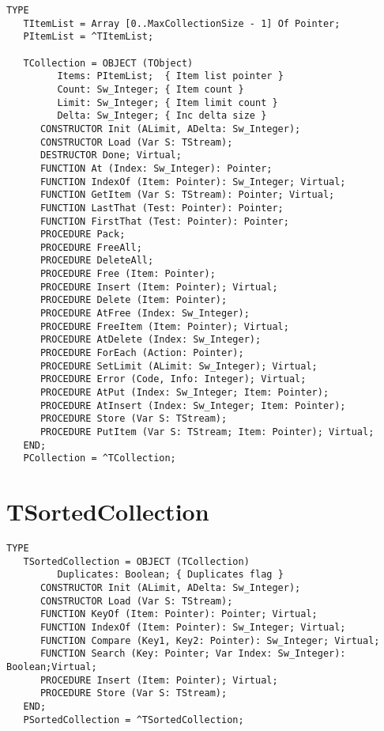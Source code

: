 \begin{verbatim}
TYPE
   TItemList = Array [0..MaxCollectionSize - 1] Of Pointer;
   PItemList = ^TItemList;

   TCollection = OBJECT (TObject)
         Items: PItemList;  { Item list pointer }
         Count: Sw_Integer; { Item count }
         Limit: Sw_Integer; { Item limit count }
         Delta: Sw_Integer; { Inc delta size }
      CONSTRUCTOR Init (ALimit, ADelta: Sw_Integer);
      CONSTRUCTOR Load (Var S: TStream);
      DESTRUCTOR Done; Virtual;
      FUNCTION At (Index: Sw_Integer): Pointer;
      FUNCTION IndexOf (Item: Pointer): Sw_Integer; Virtual;
      FUNCTION GetItem (Var S: TStream): Pointer; Virtual;
      FUNCTION LastThat (Test: Pointer): Pointer;
      FUNCTION FirstThat (Test: Pointer): Pointer;
      PROCEDURE Pack;
      PROCEDURE FreeAll;
      PROCEDURE DeleteAll;
      PROCEDURE Free (Item: Pointer);
      PROCEDURE Insert (Item: Pointer); Virtual;
      PROCEDURE Delete (Item: Pointer);
      PROCEDURE AtFree (Index: Sw_Integer);
      PROCEDURE FreeItem (Item: Pointer); Virtual;
      PROCEDURE AtDelete (Index: Sw_Integer);
      PROCEDURE ForEach (Action: Pointer);
      PROCEDURE SetLimit (ALimit: Sw_Integer); Virtual;
      PROCEDURE Error (Code, Info: Integer); Virtual;
      PROCEDURE AtPut (Index: Sw_Integer; Item: Pointer);
      PROCEDURE AtInsert (Index: Sw_Integer; Item: Pointer);
      PROCEDURE Store (Var S: TStream);
      PROCEDURE PutItem (Var S: TStream; Item: Pointer); Virtual;
   END;
   PCollection = ^TCollection;
\end{verbatim}

\section{TSortedCollection}
\label{se:TSortedCollection}

\begin{verbatim}
TYPE
   TSortedCollection = OBJECT (TCollection)
         Duplicates: Boolean; { Duplicates flag }
      CONSTRUCTOR Init (ALimit, ADelta: Sw_Integer);
      CONSTRUCTOR Load (Var S: TStream);
      FUNCTION KeyOf (Item: Pointer): Pointer; Virtual;
      FUNCTION IndexOf (Item: Pointer): Sw_Integer; Virtual;
      FUNCTION Compare (Key1, Key2: Pointer): Sw_Integer; Virtual;
      FUNCTION Search (Key: Pointer; Var Index: Sw_Integer): Boolean;Virtual;
      PROCEDURE Insert (Item: Pointer); Virtual;
      PROCEDURE Store (Var S: TStream);
   END;
   PSortedCollection = ^TSortedCollection;
\end{verbatim}

